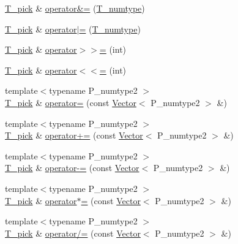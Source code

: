 \begin{DoxyCompactItemize}
\hyperlink{classVectorPick_ab257fd713ce0f2a81bc79059cec93ac9}{T\+\_\+pick} \& \hyperlink{classVectorPick_a1653ce242c9a89069266c8fc8026f7c9}{operator\&=} (\hyperlink{classVectorPick_a8e830396ccfaea2b85a2a442f45fca35}{T\+\_\+numtype})
\item 
\hyperlink{classVectorPick_ab257fd713ce0f2a81bc79059cec93ac9}{T\+\_\+pick} \& \hyperlink{classVectorPick_af6137fbd49480b5faa31fafc5658e31a}{operator$\vert$=} (\hyperlink{classVectorPick_a8e830396ccfaea2b85a2a442f45fca35}{T\+\_\+numtype})
\item 
\hyperlink{classVectorPick_ab257fd713ce0f2a81bc79059cec93ac9}{T\+\_\+pick} \& \hyperlink{classVectorPick_a5100640f7d51c229b5f4221983e23d8d}{operator$>$$>$=} (int)
\item 
\hyperlink{classVectorPick_ab257fd713ce0f2a81bc79059cec93ac9}{T\+\_\+pick} \& \hyperlink{classVectorPick_a4939c554ef8e1c71f2b72ec357eb1f23}{operator$<$$<$=} (int)
\item 
{\footnotesize template$<$typename P\+\_\+numtype2 $>$ }\\\hyperlink{classVectorPick_ab257fd713ce0f2a81bc79059cec93ac9}{T\+\_\+pick} \& \hyperlink{classVectorPick_ac8108a7e64ddf9a64fc5ae979377eb75}{operator=} (const \hyperlink{classVector}{Vector}$<$ P\+\_\+numtype2 $>$ \&)
\item 
{\footnotesize template$<$typename P\+\_\+numtype2 $>$ }\\\hyperlink{classVectorPick_ab257fd713ce0f2a81bc79059cec93ac9}{T\+\_\+pick} \& \hyperlink{classVectorPick_a30415443f980827c22d0432af087ae87}{operator+=} (const \hyperlink{classVector}{Vector}$<$ P\+\_\+numtype2 $>$ \&)
\item 
{\footnotesize template$<$typename P\+\_\+numtype2 $>$ }\\\hyperlink{classVectorPick_ab257fd713ce0f2a81bc79059cec93ac9}{T\+\_\+pick} \& \hyperlink{classVectorPick_a9e3633b6c8855e19e209e7c6e7ac5229}{operator-\/=} (const \hyperlink{classVector}{Vector}$<$ P\+\_\+numtype2 $>$ \&)
\item 
{\footnotesize template$<$typename P\+\_\+numtype2 $>$ }\\\hyperlink{classVectorPick_ab257fd713ce0f2a81bc79059cec93ac9}{T\+\_\+pick} \& \hyperlink{classVectorPick_a99078b366ebf96918c7f2cbd52384d27}{operator$\ast$=} (const \hyperlink{classVector}{Vector}$<$ P\+\_\+numtype2 $>$ \&)
\item 
{\footnotesize template$<$typename P\+\_\+numtype2 $>$ }\\\hyperlink{classVectorPick_ab257fd713ce0f2a81bc79059cec93ac9}{T\+\_\+pick} \& \hyperlink{classVectorPick_aff6a555ce0b92df9283b8e5dc666d3b7}{operator/=} (const \hyperlink{classVector}{Vector}$<$ P\+\_\+numtype2 $>$ \&)

\end{DoxyCompactItemize}
